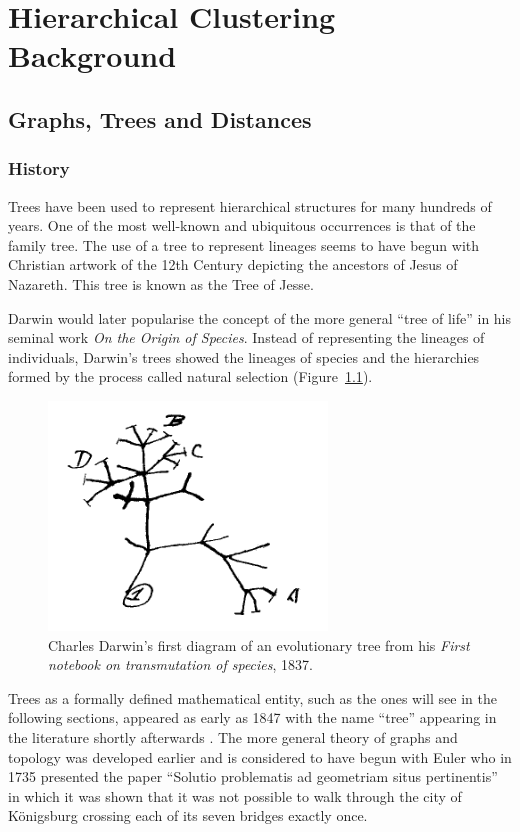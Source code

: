 \chapter{Hierarchical Clustering Background}
\label{cha:background2}



\section{Graphs, Trees and Distances}
\label{sec:graphs-trees-dist}

\subsection{History}
\label{sec:history}

Trees have been used to represent hierarchical structures for many hundreds of
years.  One of the most well-known and ubiquitous occurrences is that of the
family tree.  The use of a tree to represent lineages seems to have begun with
Christian artwork of the 12th Century depicting the ancestors of Jesus of
Nazareth.  This tree is known as the Tree of Jesse.

Darwin would later popularise the concept of the more general ``tree of life''
in his seminal work \textit{On the Origin of Species}.  Instead of
representing the lineages of individuals, Darwin's trees showed the lineages
of species and the hierarchies formed by the process called natural selection
(Figure~\ref{fig:darwin-tree}).

\begin{figure}
  \centering
  \includegraphics[width=20em]{figures/background2/darwin-tree.png}
  \caption{Charles Darwin's first diagram of an evolutionary tree from his
    \textit{First notebook on transmutation of species}, 1837.}
  \label{fig:darwin-tree}
\end{figure}

Trees as a formally defined mathematical entity, such as the ones will see in
the following sections, appeared as early as 1847 with the name ``tree''
appearing in the literature shortly afterwards \cite{knuth97taocp1}.  The more
general theory of graphs and topology was developed earlier and is considered
to have begun with Euler who in 1735 presented the paper ``Solutio problematis
ad geometriam situs pertinentis'' in which it was shown that it was not
possible to walk through the city of Königsburg crossing each of its seven
bridges exactly once.

